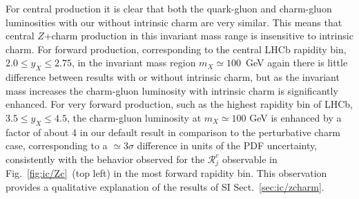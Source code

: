 For central production it is clear that both the quark-gluon and
charm-gluon luminosities with our without intrinsic charm are very similar.
This means that central $Z$+charm production in this invariant mass
range is insensitive to intrinsic charm.
%
For forward production, corresponding to the  central LHCb rapidity
bin, $2.0 \le y_X \le 2.75$, in the invariant mass region  $m_X\simeq
100$~GeV again there is little difference between results with or
without intrinsic charm, but as the invariant mass increases the
charm-gluon luminosity with intrinsic charm is significantly enhanced.
%
For very forward production, such as the highest rapidity bin of LHCb,
$3.5 \le y_X \le 4.5$, the charm-gluon luminosity 
at $m_X \simeq 100$ GeV is enhanced  by a factor of about 4 in our
default result in comparison to the perturbative charm case, corresponding
to a $\simeq 3\sigma$ difference in units of the PDF uncertainty,
consistently with the behavior observed for the 
$\mathcal{R}_j^c$ observable in Fig.~\ref{fig:ic/Zc}~(top left) in the
most forward rapidity  bin.
%
This observation provides a qualitative explanation of
the results of SI Sect.~\ref{sec:ic/zcharm}.

\clearpage




